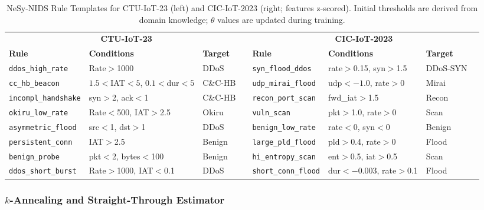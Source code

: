 \documentclass[journal]{IEEEtran}
\begin{document}
\begin{table}[!t]
\renewcommand{\arraystretch}{1.1}
\caption{NeSy-NIDS Rule Templates for CTU-IoT-23 (left) and CIC-IoT-2023
  (right; features z-scored). Initial thresholds are derived from domain
  knowledge; $\theta$ values are updated during training.}
\label{tab:rules}
\centering
\footnotesize
\begin{tabular}{llll@{\hspace{1.5em}}llll}
\toprule
\multicolumn{4}{c}{\textbf{CTU-IoT-23}} &
\multicolumn{4}{c}{\textbf{CIC-IoT-2023}} \\
\cmidrule(r){1-4}\cmidrule(l){5-8}
\textbf{Rule} & \textbf{Conditions} & \textbf{Target} & &
\textbf{Rule} & \textbf{Conditions} & \textbf{Target} & \\
\midrule
\texttt{ddos\_high\_rate}    & Rate$>$1000            & DDoS    &&
\texttt{syn\_flood\_ddos}    & rate$>$0.15, syn$>$1.5 & DDoS-SYN \\
\texttt{cc\_hb\_beacon}      & $1.5{<}$IAT$<5$, $0.1{<}$dur$<5$ & C\&C-HB &&
\texttt{udp\_mirai\_flood}   & udp$<{-}1.0$, rate$>$0 & Mirai \\
\texttt{incompl\_handshake}  & syn$>$2, ack$<$1       & C\&C-HB &&
\texttt{recon\_port\_scan}   & fwd\_iat$>$1.5         & Recon \\
\texttt{okiru\_low\_rate}    & Rate$<$500, IAT$>$2.5  & Okiru   &&
\texttt{vuln\_scan}          & pkt$>$1.0, rate$>$0    & Scan \\
\texttt{asymmetric\_flood}   & src$<$1, dst$>$1       & DDoS    &&
\texttt{benign\_low\_rate}   & rate$<$0, syn$<$0      & Benign \\
\texttt{persistent\_conn}    & IAT$>$2.5              & Benign  &&
\texttt{large\_pld\_flood}   & pld$>$0.4, rate$>$0    & Flood \\
\texttt{benign\_probe}       & pkt$<$2, bytes$<$100   & Benign  &&
\texttt{hi\_entropy\_scan}   & ent$>$0.5, iat$>$0.5   & Scan \\
\texttt{ddos\_short\_burst}  & Rate$>$1000, IAT$<$0.1 & DDoS    &&
\texttt{short\_conn\_flood}  & dur$<{-}0.003$, rate$>$0.1 & Flood \\
\bottomrule
\end{tabular}
\end{table}

\subsubsection{\texorpdfstring{$k$}{k}-Annealing and Straight-Through Estimator}
\end{document}
